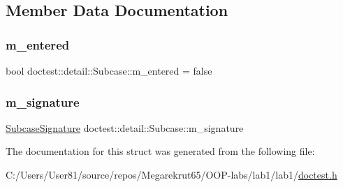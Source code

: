\subsection{Member Data Documentation}
\mbox{\label{structdoctest_1_1detail_1_1_subcase_acb703ee6e769f56fba4053447c1a36e4}} 
\subsubsection{\texorpdfstring{m\+\_\+entered}{m\_entered}}
{\footnotesize\ttfamily bool doctest\+::detail\+::\+Subcase\+::m\+\_\+entered = false}

\mbox{\label{structdoctest_1_1detail_1_1_subcase_a54730e9b88cf33ea4a5c873164029202}} 
\subsubsection{\texorpdfstring{m\+\_\+signature}{m\_signature}}
{\footnotesize\ttfamily \mbox{\hyperlink{structdoctest_1_1_subcase_signature}{Subcase\+Signature}} doctest\+::detail\+::\+Subcase\+::m\+\_\+signature}



The documentation for this struct was generated from the following file\+:\begin{DoxyCompactItemize}
\item 
C\+:/\+Users/\+User81/source/repos/\+Megarekrut65/\+O\+O\+P-\/labs/lab1/lab1/\mbox{\hyperlink{doctest_8h}{doctest.\+h}}\end{DoxyCompactItemize}
